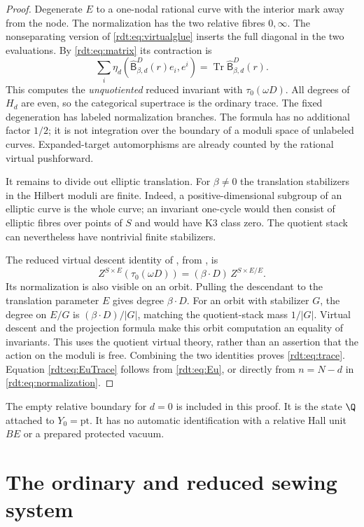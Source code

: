\begin{proof}
Degenerate $E$ to a one-nodal rational curve with the interior mark
away from the node. The normalization has the two relative fibres
$0,\infty$. The nonseparating version of
\eqref{rdt:eq:virtualglue} inserts the full diagonal in the two
evaluations. By \eqref{rdt:eq:matrix} its contraction is
\[
 \sum_i\eta_d(\widehat{\mathsf B}^D_{\beta,d}(r)e_i,e^i)
 =\operatorname{Tr}\widehat{\mathsf B}^D_{\beta,d}(r).
\]
This computes the \emph{unquotiented} reduced invariant with
$\tau_0(\omega D)$. All degrees of $H_d$ are even, so the categorical
supertrace is the ordinary trace. The fixed degeneration has labeled
normalization branches. The formula has no additional factor $1/2$;
it is not integration over the boundary of a moduli space of unlabeled
curves. Expanded-target automorphisms are already counted by the
rational virtual pushforward.

It remains to divide out elliptic translation. For $\beta\ne0$ the
translation stabilizers in the Hilbert moduli are finite. Indeed, a
positive-dimensional subgroup of an elliptic curve is the whole curve;
an invariant one-cycle would then consist of elliptic fibres over
points of $S$ and would have K3 class zero. The quotient stack can
nevertheless have nontrivial finite stabilizers.

The reduced virtual descent identity of
\cite[\S6.2]{OberdieckMC}, from \cite{OberdieckReducedPT}, is
\[
 Z^{S\times E}(\tau_0(\omega D))
   =(\beta\cdot D)\,Z^{S\times E/E}.
\]
Its normalization is also visible on an orbit. Pulling the descendant
to the translation parameter $E$ gives degree $\beta\cdot D$.
For an orbit with stabilizer $G$, the degree on $E/G$ is
$(\beta\cdot D)/|G|$, matching the quotient-stack mass $1/|G|$.
Virtual descent and the projection formula make this orbit computation
an equality of invariants. This uses the quotient virtual theory,
rather than an assertion that the action on the moduli is free.
Combining the two identities proves \eqref{rdt:eq:trace}.
Equation \eqref{rdt:eq:EuTrace} follows from
\eqref{rdt:eq:Eu}, or directly from $n=N-d$ in
\eqref{rdt:eq:normalization}.
\end{proof}

The empty relative boundary for $d=0$ is included in this proof.
It is the state $\Q$ attached to $Y_0=\mathrm{pt}$. It has no
automatic identification with a relative Hall unit $BE$ or a prepared
protected vacuum.

\section{The ordinary and reduced sewing system}
\label{rdt:sec:firstorder}

